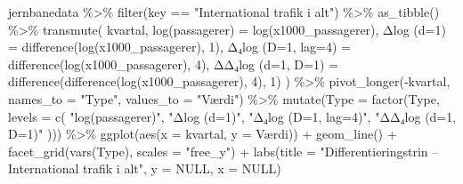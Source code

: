 \documentclass[
  danish,
]{article}
\newenvironment{Shaded}{\begin{snugshade}}{\end{snugshade}}
\newcommand{\AttributeTok}[1]{\textcolor[rgb]{0.40,0.45,0.13}{#1}}
\newcommand{\ConstantTok}[1]{\textcolor[rgb]{0.56,0.35,0.01}{#1}}
\newcommand{\DecValTok}[1]{\textcolor[rgb]{0.68,0.00,0.00}{#1}}
\newcommand{\FunctionTok}[1]{\textcolor[rgb]{0.28,0.35,0.67}{#1}}
\newcommand{\NormalTok}[1]{\textcolor[rgb]{0.00,0.23,0.31}{#1}}
\newcommand{\OtherTok}[1]{\textcolor[rgb]{0.00,0.23,0.31}{#1}}
\newcommand{\SpecialCharTok}[1]{\textcolor[rgb]{0.37,0.37,0.37}{#1}}
\newcommand{\StringTok}[1]{\textcolor[rgb]{0.13,0.47,0.30}{#1}}
\begin{document}
\begin{Shaded}
\begin{Highlighting}[]
\NormalTok{jernbanedata }\SpecialCharTok{\%\textgreater{}\%}
  \FunctionTok{filter}\NormalTok{(key }\SpecialCharTok{==} \StringTok{"International trafik i alt"}\NormalTok{) }\SpecialCharTok{\%\textgreater{}\%}
  \FunctionTok{as\_tibble}\NormalTok{() }\SpecialCharTok{\%\textgreater{}\%}
  \FunctionTok{transmute}\NormalTok{(}
\NormalTok{    kvartal,}
    \StringTok{\textasciigrave{}}\AttributeTok{log(passagerer)}\StringTok{\textasciigrave{}}     \OtherTok{=} \FunctionTok{log}\NormalTok{(x1000\_passagerer),}
    \StringTok{\textasciigrave{}}\AttributeTok{Δlog (d=1)}\StringTok{\textasciigrave{}}           \OtherTok{=} \FunctionTok{difference}\NormalTok{(}\FunctionTok{log}\NormalTok{(x1000\_passagerer), }\DecValTok{1}\NormalTok{),}
    \StringTok{\textasciigrave{}}\AttributeTok{Δ₄log (D=1, lag=4)}\StringTok{\textasciigrave{}}  \OtherTok{=} \FunctionTok{difference}\NormalTok{(}\FunctionTok{log}\NormalTok{(x1000\_passagerer), }\DecValTok{4}\NormalTok{),}
    \StringTok{\textasciigrave{}}\AttributeTok{ΔΔ₄log (d=1, D=1)}\StringTok{\textasciigrave{}}   \OtherTok{=} \FunctionTok{difference}\NormalTok{(}\FunctionTok{difference}\NormalTok{(}\FunctionTok{log}\NormalTok{(x1000\_passagerer), }\DecValTok{4}\NormalTok{), }\DecValTok{1}\NormalTok{)}
\NormalTok{  ) }\SpecialCharTok{\%\textgreater{}\%}
  \FunctionTok{pivot\_longer}\NormalTok{(}\SpecialCharTok{{-}}\NormalTok{kvartal, }\AttributeTok{names\_to =} \StringTok{"Type"}\NormalTok{, }\AttributeTok{values\_to =} \StringTok{"Værdi"}\NormalTok{) }\SpecialCharTok{\%\textgreater{}\%}
  \FunctionTok{mutate}\NormalTok{(}\AttributeTok{Type =} \FunctionTok{factor}\NormalTok{(Type, }\AttributeTok{levels =} \FunctionTok{c}\NormalTok{(}
    \StringTok{"log(passagerer)"}\NormalTok{, }\StringTok{"Δlog (d=1)"}\NormalTok{, }\StringTok{"Δ₄log (D=1, lag=4)"}\NormalTok{, }\StringTok{"ΔΔ₄log (d=1, D=1)"}
\NormalTok{  ))) }\SpecialCharTok{\%\textgreater{}\%}
  \FunctionTok{ggplot}\NormalTok{(}\FunctionTok{aes}\NormalTok{(}\AttributeTok{x =}\NormalTok{ kvartal, }\AttributeTok{y =}\NormalTok{ Værdi)) }\SpecialCharTok{+}
  \FunctionTok{geom\_line}\NormalTok{() }\SpecialCharTok{+}
  \FunctionTok{facet\_grid}\NormalTok{(}\FunctionTok{vars}\NormalTok{(Type), }\AttributeTok{scales =} \StringTok{"free\_y"}\NormalTok{) }\SpecialCharTok{+}
  \FunctionTok{labs}\NormalTok{(}\AttributeTok{title =} \StringTok{"Differentieringstrin – International trafik i alt"}\NormalTok{,}
       \AttributeTok{y =} \ConstantTok{NULL}\NormalTok{, }\AttributeTok{x =} \ConstantTok{NULL}\NormalTok{)}
\end{Highlighting}
\end{Shaded}
\end{document}
